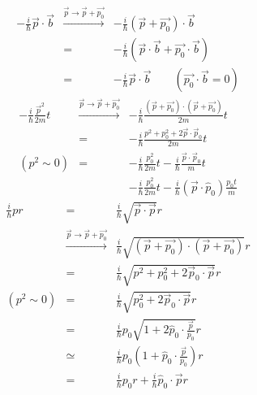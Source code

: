 \documentclass[../../FisicaTeorica.tex]{subfiles}
\begin{document}
\begin{eqnarray*}
  - \frac{i}{\hbar} \vec{p} \cdot \vec{b} & \xrightarrow{\vec{p} \to \vec{p} +
  \overrightarrow{p_0}} & - \frac{i}{\hbar} (\vec{p} + \overrightarrow{p_0})
  \cdot \vec{b}\\
  & = & - \frac{i}{\hbar} (\vec{p} \cdot \vec{b} + \overrightarrow{p_0} \cdot
  \vec{b})\\
  & = & - \frac{i}{\hbar} \vec{p} \cdot \vec{b} \qquad (\overrightarrow{p_0}
  \cdot \vec{b} = 0)
\end{eqnarray*}
\[ \begin{array}{lll}
     - \frac{i}{\hbar} \frac{\vec{p}^2}{2 m} t & \xrightarrow{\vec{p} \to
     \vec{p} + \overrightarrow{p_0}} & - \frac{i}{\hbar}  \frac{(\vec{p} +
     \overrightarrow{p_0}) \cdot (\vec{p} + \overrightarrow{p_0})}{2 m} t\\
     & = & - \frac{i}{\hbar}  \frac{p^2 + p_0^2 + 2 \vec{p} \cdot
     \vec{p}_0}{2 m} t\\
     (p^2 \sim 0) & = & - \frac{i}{\hbar}  \frac{p_0^2}{2 m} t -
     \frac{i}{\hbar}  \frac{\vec{p} \cdot \vec{p}_0}{m} t\\
     &  & - \frac{i}{\hbar}  \frac{p_0^2}{2 m} t - \frac{i}{\hbar}  (\vec{p}
     \cdot \hat{p}_0) \frac{p_0 t}{m}
   \end{array} \]
\[ \begin{array}{lll}
     \frac{i}{\hbar} pr & = & \frac{i}{\hbar}  \sqrt{\vec{p} \cdot \vec{p}}
     r\\
     & \xrightarrow{\vec{p} \to \vec{p} + \overrightarrow{p_0}} &
     \frac{i}{\hbar}  \sqrt{(\vec{p} + \overrightarrow{p_0}) \cdot (\vec{p} +
     \overrightarrow{p_0})} r\\
     & = & \frac{i}{\hbar}  \sqrt{p^2 + p_0^2 + 2 \vec{p}_0 \cdot \vec{p}}
     r\\
     (p^2 \sim 0) & = & \frac{i}{\hbar}  \sqrt{p_0^2 + 2 \vec{p}_0 \cdot
     \vec{p}} r\\
     & = & \frac{i}{\hbar} p_0 \sqrt{1 + 2 \hat{p}_0 \cdot
     \frac{\vec{p}}{p_0}} r\\
     & \simeq & \frac{i}{\hbar} p_0 \left( 1 + \hat{p}_0 \cdot
     \frac{\vec{p}}{p_0} \right) r\\
     & = & \frac{i}{\hbar} p_0 r + \frac{i}{\hbar}  \hat{p}_0 \cdot \vec{p} r
   \end{array} \]
\end{document}
